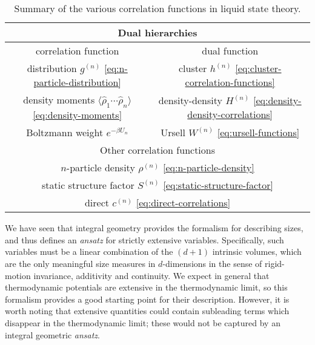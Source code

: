 \documentclass[11pt,twoside]{report}
\begin{document}
\begin{SCtable}
  \begin{minipage}[b]{\linewidth}
    \centering
    \begin{tabular}{cc}
      \toprule
      \multicolumn{2}{c}{Dual hierarchies} \\
      \midrule
      correlation function & dual function \\
      \midrule
      distribution $g^{(n)}$ \eqref{eq:n-particle-distribution} &
      cluster $h^{(n)}$ \eqref{eq:cluster-correlation-functions} \\
      density moments $\langle \hat{\rho}_1 \cdots \hat{\rho}_n \rangle$ \eqref{eq:density-moments} &
      density-density $H^{(n)}$ \eqref{eq:density-density-correlations} \\
      Boltzmann weight $e^{-\beta U_n}$ &
      Ursell $W^{(n)}$ \eqref{eq:ursell-functions} \\
      \midrule
      \multicolumn{2}{c}{Other correlation functions} \\
      \midrule
      \multicolumn{2}{c}{$n$-particle density $\rho^{(n)}$ \eqref{eq:n-particle-density}} \\
      \multicolumn{2}{c}{static structure factor $S^{(n)}$ \eqref{eq:static-structure-factor}} \\
      \multicolumn{2}{c}{direct $c^{(n)}$ \eqref{eq:direct-correlations}} \\
      \bottomrule
    \end{tabular}
  \end{minipage}
  \caption{Summary of the various correlation functions in liquid state theory.}
  \label{table:correlation-functions}
\end{SCtable}

We have seen that integral geometry provides the formalism for describing sizes, and thus defines an \emph{ansatz} for strictly extensive variables.
Specifically, such variables must be a linear combination of the $(d+1)$ intrinsic volumes, which are the only meaningful size measures in $d$-dimensions in the sense of rigid-motion invariance, additivity and continuity.
We expect in general that thermodynamic potentials are extensive in the thermodynamic limit, so this formalism provides a good starting point for their description.
However, it is worth noting that extensive quantities could contain subleading terms which disappear in the thermodynamic limit; these would not be captured by an integral geometric \emph{ansatz}.
\end{document}

